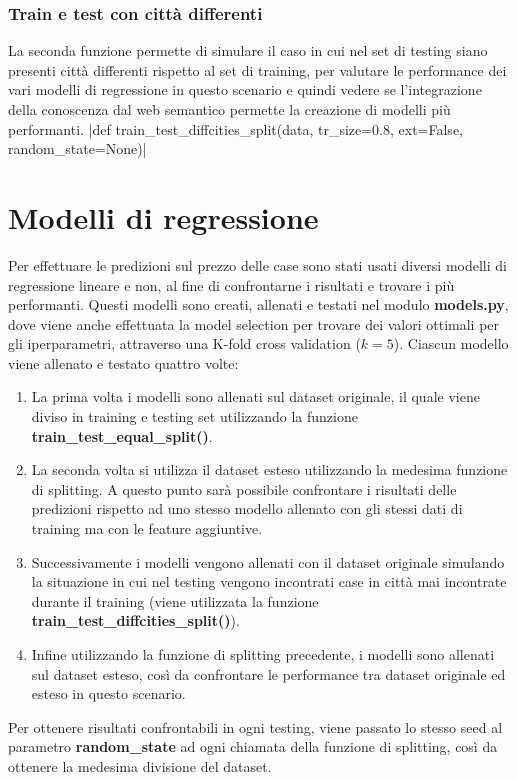 \documentclass{article}
\begin{document}
\subsubsection{Train e test con città differenti}
\label{sec:diffsplit}
La seconda funzione permette di simulare il caso in cui nel set di testing
siano presenti città differenti rispetto al set di training, per valutare le
performance dei vari modelli di regressione in questo scenario e quindi
vedere se l'integrazione della conoscenza dal web semantico permette la
creazione di modelli più performanti.
|def train_test_diffcities_split(data, tr_size=0.8, ext=False, random_state=None)|

\section{Modelli di regressione}
\label{sec:regressionintro}
Per effettuare le predizioni sul prezzo delle case sono stati usati diversi
modelli di regressione lineare e non, al fine di confrontarne i risultati
e trovare i più performanti. Questi modelli sono creati, allenati e testati
nel modulo \textbf{models.py}, dove viene anche effettuata la model
selection per trovare dei valori ottimali per gli iperparametri, attraverso
una K-fold cross validation ($k = 5$). Ciascun modello viene allenato e testato
quattro volte:
\begin{enumerate}
	\item La prima volta i modelli sono allenati sul dataset originale, il
		quale viene diviso in training e testing set utilizzando la funzione
		\textbf{train\_test\_equal\_split()}.
	\item La seconda volta si utilizza il dataset esteso utilizzando la
		medesima funzione di splitting. A questo punto sarà possibile
		confrontare i risultati delle predizioni rispetto ad uno stesso modello
		allenato con gli stessi dati di training ma con le feature aggiuntive.
	\item Successivamente i modelli vengono allenati con il dataset originale
		simulando la situazione in cui nel testing vengono incontrati case
		in città mai incontrate durante il training (viene utilizzata la
		funzione \textbf{train\_test\_diffcities\_split()}).
	\item Infine utilizzando la funzione di splitting precedente, i
		modelli sono allenati sul dataset esteso, così da confrontare le
		performance tra dataset originale ed esteso in questo scenario.
\end{enumerate}
Per ottenere risultati confrontabili in ogni testing, viene passato lo stesso
seed al parametro \textbf{random\_state} ad ogni chiamata della funzione di
splitting, così da ottenere la medesima divisione del dataset.
\end{document}
